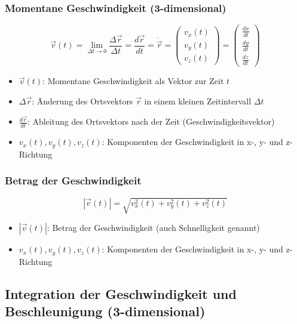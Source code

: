 \documentclass[a4paper, 8pt]{extarticle}
\begin{document}
\begin{landscape}
\begin{multicols*}{3}
\subsubsection{Momentane Geschwindigkeit (3-dimensional)}
\[
\vec{v}(t) = \lim_{\Delta t \to 0} \frac{\Delta \vec{r}}{\Delta t} = \frac{d\vec{r}}{dt} = \dot{\vec{r}} = \begin{pmatrix} v_x(t) \\ v_y(t) \\ v_z(t) \end{pmatrix} = \begin{pmatrix} \frac{dx}{dt} \\ \frac{dy}{dt} \\ \frac{dz}{dt} \end{pmatrix}
\]
{\footnotesize
\begin{itemize}
    \item \( \vec{v}(t) \): Momentane Geschwindigkeit als Vektor zur Zeit \( t \)
    \item \( \Delta \vec{r} \): Änderung des Ortsvektors \( \vec{r} \) in einem kleinen Zeitintervall \( \Delta t \)
    \item \( \frac{d\vec{r}}{dt} \): Ableitung des Ortsvektors nach der Zeit (Geschwindigkeitsvektor)
    \item \( v_x(t), v_y(t), v_z(t) \): Komponenten der Geschwindigkeit in x-, y- und z-Richtung
\end{itemize}
}

\subsubsection{Betrag der Geschwindigkeit}
\[
|\vec{v}(t)| = \sqrt{v_x^2(t) + v_y^2(t) + v_z^2(t)}
\]
{\footnotesize
\begin{itemize}
    \item \( |\vec{v}(t)| \): Betrag der Geschwindigkeit (auch Schnelligkeit genannt)
    \item \( v_x(t), v_y(t), v_z(t) \): Komponenten der Geschwindigkeit in x-, y- und z-Richtung
\end{itemize}
}

\subsection{Integration der Geschwindigkeit und Beschleunigung (3-dimensional)}


\end{multicols*}
\end{landscape}
\end{document}
